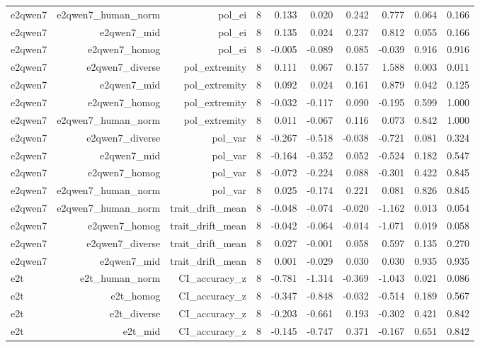 \documentclass[11pt]{article}
\begin{document}
\begin{landscape}
\begin{longtable}{@{}lrrrrrrrrr@{}}
e2qwen7 & e2qwen7\_human\_norm & pol\_ei & 8 & 0.133 & 0.020 & 0.242 & 0.777 & 0.064 & 0.166 \\
e2qwen7 & e2qwen7\_mid & pol\_ei & 8 & 0.135 & 0.024 & 0.237 & 0.812 & 0.055 & 0.166 \\
e2qwen7 & e2qwen7\_homog & pol\_ei & 8 & -0.005 & -0.089 & 0.085 & -0.039 & 0.916 & 0.916 \\
e2qwen7 & e2qwen7\_diverse & pol\_extremity & 8 & 0.111 & 0.067 & 0.157 & 1.588 & 0.003 & 0.011 \\
e2qwen7 & e2qwen7\_mid & pol\_extremity & 8 & 0.092 & 0.024 & 0.161 & 0.879 & 0.042 & 0.125 \\
e2qwen7 & e2qwen7\_homog & pol\_extremity & 8 & -0.032 & -0.117 & 0.090 & -0.195 & 0.599 & 1.000 \\
e2qwen7 & e2qwen7\_human\_norm & pol\_extremity & 8 & 0.011 & -0.067 & 0.116 & 0.073 & 0.842 & 1.000 \\
e2qwen7 & e2qwen7\_diverse & pol\_var & 8 & -0.267 & -0.518 & -0.038 & -0.721 & 0.081 & 0.324 \\
e2qwen7 & e2qwen7\_mid & pol\_var & 8 & -0.164 & -0.352 & 0.052 & -0.524 & 0.182 & 0.547 \\
e2qwen7 & e2qwen7\_homog & pol\_var & 8 & -0.072 & -0.224 & 0.088 & -0.301 & 0.422 & 0.845 \\
e2qwen7 & e2qwen7\_human\_norm & pol\_var & 8 & 0.025 & -0.174 & 0.221 & 0.081 & 0.826 & 0.845 \\
e2qwen7 & e2qwen7\_human\_norm & trait\_drift\_mean & 8 & -0.048 & -0.074 & -0.020 & -1.162 & 0.013 & 0.054 \\
e2qwen7 & e2qwen7\_homog & trait\_drift\_mean & 8 & -0.042 & -0.064 & -0.014 & -1.071 & 0.019 & 0.058 \\
e2qwen7 & e2qwen7\_diverse & trait\_drift\_mean & 8 & 0.027 & -0.001 & 0.058 & 0.597 & 0.135 & 0.270 \\
e2qwen7 & e2qwen7\_mid & trait\_drift\_mean & 8 & 0.001 & -0.029 & 0.030 & 0.030 & 0.935 & 0.935 \\
e2t & e2t\_human\_norm & CI\_accuracy\_z & 8 & -0.781 & -1.314 & -0.369 & -1.043 & 0.021 & 0.086 \\
e2t & e2t\_homog & CI\_accuracy\_z & 8 & -0.347 & -0.848 & -0.032 & -0.514 & 0.189 & 0.567 \\
e2t & e2t\_diverse & CI\_accuracy\_z & 8 & -0.203 & -0.661 & 0.193 & -0.302 & 0.421 & 0.842 \\
e2t & e2t\_mid & CI\_accuracy\_z & 8 & -0.145 & -0.747 & 0.371 & -0.167 & 0.651 & 0.842 \\

\end{longtable}
\end{landscape}
\end{document}
